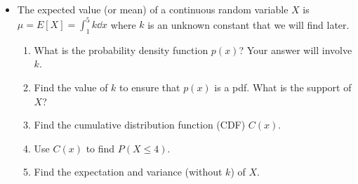 \documentclass[11pt]{article}
\begin{document}
\begin{itemize}
\begin{enumerate}[label=(\alph*)]
        \item Find the expectation of \( X \).

    \end{enumerate}

    \pagebreak

\item[\textbf{P2.}] The expected value (or mean) of a continuous random variable $X$ is $\displaystyle \mu=E[X]=\int_1^5k \dd{x}$ where $k$ is an unknown constant that we will find later. 
    \begin{enumerate}[label=(\alph*)]

        \item What is the probability density function $p(x)$? Your answer will involve $k$.
            \vspace{3cm}

        \item Find the value of $k$ to ensure that $p(x)$ is a pdf. What is the support of \( X \)?
            \vspace{3cm}

        \item Find the cumulative distribution function (CDF) $C(x)$.
            \vspace{3cm}

        \item Use $C(x)$ to find $P(X \leq 4)$.
            \vspace{3cm}

        \item Find the expectation and variance (without \( k \)) of \( X \).

    \end{enumerate}
\end{itemize}
\end{document}
